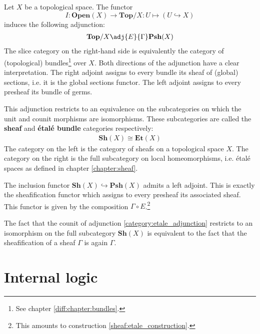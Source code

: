 	\begin{construct}
		Let $X$ be a topological space. The functor \[I:\textbf{Open}(X)\rightarrow\textbf{Top}/X:U\mapsto(U\hookrightarrow X)\] induces the following adjunction:
		\begin{gather}
			\label{category:etale_adjunction}
			 \mathbf{Top}/X\adj{E}{\Gamma}\mathbf{Psh}(X)
		\end{gather}
		The slice category on the right-hand side is equivalently the category of (topological) bundles\footnote{See chapter \ref{diff:chapter:bundles}.} over $X$. Both directions of the adjunction have a clear interpretation. The right adjoint assigns to every bundle its sheaf of (global) sections, i.e. it is the global sections functor. The left adjoint assigns to every presheaf its bundle of germs.
		
		This adjunction restricts to an equivalence on the subcategories on which the unit and counit morphisms are isomorphisms. These subcategories are called the \textbf{sheaf} and \textbf{\'etal\'e bundle} categories respectively:
		\begin{gather}
			\textbf{Sh}(X) \cong \textbf{Et}(X)
		\end{gather}
		The category on the left is the category of sheafs on a topological space $X$. The category on the right is the full subcategory on local homeomorphisms, i.e. \'etal\'e spaces as defined in chapter \ref{chapter:sheaf}.
	\end{construct}
	
	\begin{property}
		The inclusion functor $\textbf{Sh}(X)\hookrightarrow\textbf{Psh}(X)$ admits a left adjoint. This is exactly the sheafification functor which assigns to every presheaf its associated sheaf. This functor is given by the composition $\Gamma\circ E$.\footnote{This amounts to construction \ref{sheaf:etale_construction}.}
		
		The fact that the counit of adjunction \ref{category:etale_adjunction} restricts to an isomorphism on the full subcategory $\textbf{Sh}(X)$ is equivalent to the fact that the sheafification of a sheaf $\Gamma$ is again $\Gamma$.
	\end{property}

	
\section{Internal logic}\label{cat:internal_logic}

